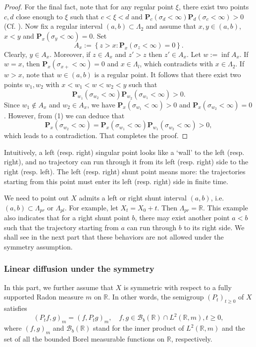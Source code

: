 \documentclass[a4paper]{amsart}
\theoremstyle{definition}
\theoremstyle{remark}
\numberwithin{equation}{section}
\begin{document}
\begin{proof}
For the final fact, note that for any regular point $\xi$, there exist two points $c,d$ close enough to $\xi$ such that $c<\xi<d$ and $\mathbf{P}_c(\sigma_d<\infty)\mathbf{P}_d(\sigma_c<\infty)>0$ (Cf. \cite[\S3.4]{IM74}). Now fix a regular interval $(a,b)\subset \Lambda_2$ and assume that $x,y\in (a,b)$, $x<y$ and $\mathbf{P}_x(\sigma_y<\infty)=0$. Set
\[
A_x:=\left\{z>x: \mathbf{P}_x(\sigma_z<\infty)=0\right\}.
\]
Clearly, $y\in A_x$. Moreover, if $z\in A_x$ and $z'>z$ then $z'\in A_x$. Let $w:=\inf A_x$. If $w=x$, then $\mathbf{P}_x(\sigma_{x+}<\infty)=0$ and $x\in \Lambda_l$, which contradicts with $x\in \Lambda_2$. If $w>x$, note that $w\in (a,b)$ is a regular point. It follows that there exist two points $w_1, w_2$ with $x<w_1<w<w_2<y$ such that
\[
\mathbf{P}_{w_1}(\sigma_{w_2}<\infty)\mathbf{P}_{w_2}(\sigma_{w_1}<\infty)>0.
\]
Since $w_1\notin A_x$ and $w_2\in A_x$, we have $\mathbf{P}_x(\sigma_{w_1}<\infty)>0$ and $\mathbf{P}_x(\sigma_{w_2}<\infty)=0$. However, from (1) we can deduce that
\[
	\mathbf{P}_x(\sigma_{w_2}<\infty)=\mathbf{P}_x(\sigma_{w_1}<\infty)\mathbf{P}_{w_1}(\sigma_{w_2}<\infty)>0,
\]
which leads to a contradiction. That completes the proof.
\end{proof}

{Intuitively, a left (resp. right) singular point looks like a `wall' to the left (resp. right), and no trajectory can run through it from its left (resp. right) side to the right (resp. left). The left (resp. right) shunt point means more: the trajectories starting from this point must enter its left (resp. right) side in finite time.

We need to point out $X$ admits a left or right shunt interval $(a,b)$, i.e. $(a,b)\subset \Lambda_{pr}$ or $\Lambda_{pl}$. For example, let $X_t=X_0+t$. Then $\Lambda_{pr}=\mathbb{R}$. This example also indicates that for a right shunt point $b$, there may exist another point $a<b$ such that the trajectory starting from $a$ can run through $b$ to its right side. We shall see in the next part that these behaviors are not allowed under the symmetry assumption. }

\subsubsection{Linear diffusion under the symmetry}\label{SEC222}

In this part, we further assume that $X$ is symmetric with respect to a fully supported Radon measure $m$ on $\mathbb{R}$. In other words, the semigroup $(P_t)_{t\geq 0}$ of $X$ satisfies
\begin{equation}\label{EQ2PTF}
	(P_tf,g)_m=(f,P_tg)_m,\quad f,g\in \mathcal{B}_b(\mathbb{R})\cap L^2(\mathbb{R},m), t\geq 0,
\end{equation}
where $(f,g)_m$ and $\mathcal{B}_b(\mathbb{R})$ stand for the inner product of $L^2(\mathbb{R},m)$ and the set of all the bounded Borel measurable functions on $\mathbb{R}$, respectively.
\end{document}
